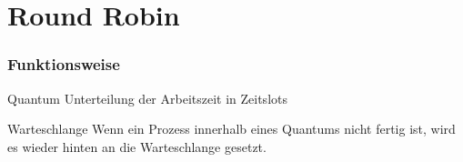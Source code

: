 \section{Round Robin}

\begin{frame}
    \frametitle{Funktionsweise}



    \begin{block}{Quantum}
        Unterteilung der Arbeitszeit in Zeitslots
    \end{block}

    \begin{block}{Warteschlange}
        Wenn ein Prozess innerhalb eines Quantums nicht fertig ist, wird es wieder hinten an die Warteschlange gesetzt.
    \end{block}

\end{frame}
